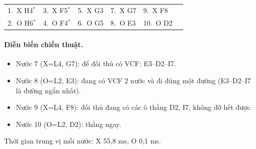 {\footnotesize\linespread{1}\selectfont
\noindent\begin{tabularx}{\linewidth}{*{6}{X}}
\toprule
1.~X H4$^\ast$ & 3.~X F5$^\ast$ & 5.~X G3 & 7.~X G7 & 9.~X F8 &  \\
2.~O H6$^\ast$ & 4.~O F4$^\ast$ & 6.~O G5 & 8.~O E3 & 10.~O D2 &  \\
\bottomrule
\end{tabularx}\par}
\paragraph{Diễn biến chiến thuật.}
\begin{itemize}\small
\setlength{\itemsep}{0pt}
  \item Nước 7 (X=L4, G7): để đối thủ có VCF: E3--D2--I7.
  \item Nước 8 (O=L2, E3): đang có VCF 2 nước và đi đúng một đường (E3--D2--I7 là đường ngắn nhất).
  \item Nước 9 (X=L4, F8): đối thủ đang có các ô thắng D2, I7, không đỡ hết được.
  \item Nước 10 (O=L2, D2): thắng ngay.
\end{itemize}
Thời gian trung vị mỗi nước: X 55,8 ms, O 0,1 ms.
\clearpage

